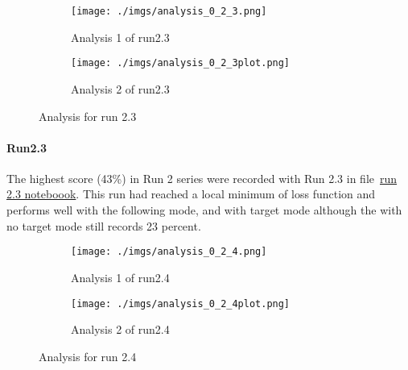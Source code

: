 \documentclass[paper=a4, fontsize=11pt]{scrartcl} %
\numberwithin{equation}{section} %
\numberwithin{figure}{section} %
\numberwithin{table}{section} %
\begin{document}
\begin{enumerate}
\begin{itemize}
{\begin{figure}
   \begin{subfigure}{0.45\textwidth}
   \texttt{[image: ./imgs/analysis\_0\_2\_3.png]} 
   \caption{Analysis 1 of run2.3}
   \label{fig:subAnalysisRun23}
   \end{subfigure}
   \begin{subfigure}{0.45\textwidth}
   \texttt{[image: ./imgs/analysis\_0\_2\_3plot.png]}
   \caption{Analysis 2 of run2.3}
   \label{fig:subAnalysisRun23plot}
   \end{subfigure}
	
   \caption{Analysis for run 2.3}
   \label{fig:AnalysisRun23}
\end{figure}
\paragraph{Run2.3}\label{rubric70}
The highest score (43\%) in Run 2 series were recorded with Run 2.3 in file~\href{run:../code/model_training.ipynb}{run 2.3 noteboook}. This run had reached a  local minimum of loss function and performs well with the following mode, and with target mode although the with no target mode still records 23 percent.

\begin{figure}	
	\begin{subfigure}{0.45\textwidth}
	\texttt{[image: ./imgs/analysis\_0\_2\_4.png]} 
	\caption{Analysis 1 of run2.4}
	\label{fig:subAnalysisRun24}
	\end{subfigure}
	\begin{subfigure}{0.45\textwidth}
	\texttt{[image: ./imgs/analysis\_0\_2\_4plot.png]}
	\caption{Analysis 2 of run2.4}
	\label{fig:subAnalysisRun24plot}
	\end{subfigure}
	 
	\caption{Analysis for run 2.4}
	\label{fig:AnalysisRun24}
 \end{figure}
}
\end{itemize}
\end{enumerate}
\end{document}
